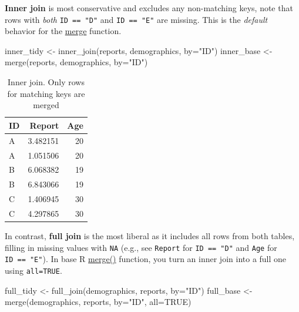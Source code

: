 \documentclass[
]{book}
\newenvironment{Shaded}{\begin{snugshade}}{\end{snugshade}}
\newcommand{\AttributeTok}[1]{\textcolor[rgb]{0.77,0.63,0.00}{#1}}
\newcommand{\ConstantTok}[1]{\textcolor[rgb]{0.00,0.00,0.00}{#1}}
\newcommand{\FunctionTok}[1]{\textcolor[rgb]{0.00,0.00,0.00}{#1}}
\newcommand{\NormalTok}[1]{#1}
\newcommand{\OtherTok}[1]{\textcolor[rgb]{0.56,0.35,0.01}{#1}}
\newcommand{\StringTok}[1]{\textcolor[rgb]{0.31,0.60,0.02}{#1}}
\begin{document}
\textbf{Inner join} is most conservative and excludes any non-matching keys, note that rows with \emph{both} \texttt{ID\ ==\ "D"} and \texttt{ID\ ==\ "E"} are missing. This is the \emph{default} behavior for the \href{https://stat.ethz.ch/R-manual/R-devel/library/base/html/merge.html}{merge} function.

\begin{Shaded}
\begin{Highlighting}[]
\NormalTok{inner\_tidy }\OtherTok{\textless{}{-}} \FunctionTok{inner\_join}\NormalTok{(reports, demographics, }\AttributeTok{by=}\StringTok{"ID"}\NormalTok{) }
\NormalTok{inner\_base }\OtherTok{\textless{}{-}} \FunctionTok{merge}\NormalTok{(reports, demographics, }\AttributeTok{by=}\StringTok{"ID"}\NormalTok{)}
\end{Highlighting}
\end{Shaded}

\begin{table}

\caption{\label{tab:unnamed-chunk-189}Inner join. Only rows for matching keys are merged}
\centering
\begin{tabular}[t]{l|r|r}
\hline
ID & Report & Age\\
\hline
A & 3.482151 & 20\\
\hline
A & 1.051506 & 20\\
\hline
B & 6.068382 & 19\\
\hline
B & 6.843066 & 19\\
\hline
C & 1.406945 & 30\\
\hline
C & 4.297865 & 30\\
\hline
\end{tabular}
\end{table}

In contrast, \textbf{full join} is the most liberal as it includes all rows from both tables, filling in missing values with \texttt{NA} (e.g., see \texttt{Report} for \texttt{ID\ ==\ "D"} and \texttt{Age} for \texttt{ID\ ==\ "E"}). In base R \href{https://stat.ethz.ch/R-manual/R-devel/library/base/html/merge.html}{merge()} function, you turn an inner join into a full one using \texttt{all=TRUE}.

\begin{Shaded}
\begin{Highlighting}[]
\NormalTok{full\_tidy }\OtherTok{\textless{}{-}} \FunctionTok{full\_join}\NormalTok{(demographics, reports, }\AttributeTok{by=}\StringTok{"ID"}\NormalTok{) }
\NormalTok{full\_base }\OtherTok{\textless{}{-}} \FunctionTok{merge}\NormalTok{(demographics, reports, }\AttributeTok{by=}\StringTok{"ID"}\NormalTok{, }\AttributeTok{all=}\ConstantTok{TRUE}\NormalTok{)}
\end{Highlighting}
\end{Shaded}
\end{document}

